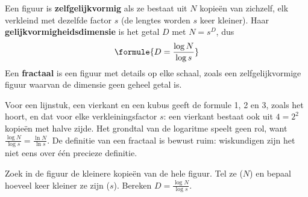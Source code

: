 \begin{theorie}
Een figuur is \textbf{\textcolor{accent}{zelfgelijkvormig}} als ze bestaat uit $N$ kopieën van zichzelf, elk verkleind met dezelfde factor $s$ (de lengtes worden $s$ keer kleiner). Haar \textbf{\textcolor{accent}{gelijkvormigheidsdimensie}} is het getal $D$ met $N = s^D$, dus
\[
\formule{D = \frac{\log N}{\log s}}
\]
Een \textbf{\textcolor{accent}{fractaal}} is een figuur met details op elke schaal, zoals een zelfgelijkvormige figuur waarvan de dimensie geen geheel getal is.
\end{theorie}

Voor een lijnstuk, een vierkant en een kubus geeft de formule 1, 2 en 3, zoals het hoort, en dat voor elke verkleiningsfactor $s$: een vierkant bestaat ook uit $4 = 2^2$ kopieën met halve zijde. Het grondtal van de logaritme speelt geen rol, want $\tfrac{\log N}{\log s} = \tfrac{\ln N}{\ln s}$. De definitie van een fractaal is bewust ruim: wiskundigen zijn het niet eens over één precieze definitie.


\begin{werkwijze}
Zoek in de figuur de kleinere kopieën van de hele figuur. Tel ze ($N$) en bepaal hoeveel keer kleiner ze zijn ($s$). Bereken $D = \tfrac{\log N}{\log s}$.
\end{werkwijze}


\begin{oefeningen}
\end{oefeningen}

